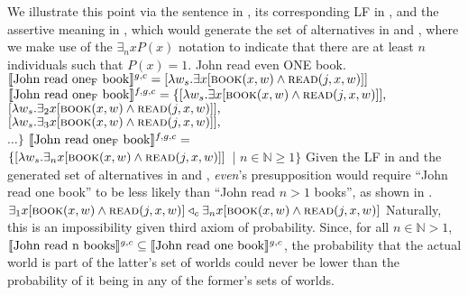 We illustrate this point via the sentence in , its corresponding LF in , and the assertive meaning in , which would generate the set of alternatives in  and , where we make use of the $\exists_nxP(x)$ notation to indicate that there are at least $n$ individuals such that $P(x)=1$.
\pex
\a\ljudge{\#} John read even \MakeUppercase{one} book.
\a[] [even\textsubscript{C} [John read one\textsubscript{F} book]
\a $\intension[g,c]{John read one\textsubscript{F} book}=[\lambda{w_s}.\exists{x}[\predicate{book}(x,w)\land\predicate{read}(j,x,w)]]$
\a $\intension[f,g,c]{John read one\textsubscript{F} book}=\{[\lambda{w_s}.\exists{x}[\predicate{book}(x,w)\land\predicate{read}(j,x,w)]],$\\
$[\lambda{w_s}.\exists_2{x}[\predicate{book}(x,w)\land\predicate{read}(j,x,w)]],$\\
$[\lambda{w_s}.\exists_3{x}[\predicate{book}(x,w)\land\predicate{read}(j,x,w)]],$\\
$\ldots\}$
\a $\intension[f,g,c]{John read one\textsubscript{F} book}=$\\\emptyfill$\{[\lambda{w_s}.\exists_n{x}[\predicate{book}(x,w)\land\predicate{read}(j,x,w)]]$~| $n\in\mathbb{N}\geqslant1\}$
\xe
Given the LF in  and the generated set of alternatives in  and , \textit{even}'s presupposition would require \enquote{John read one book} to be less likely than \enquote{John read $n>1$ books}, as shown in .
\ex
{}\\$\exists_1{x}[\predicate{book}(x,w)\land\predicate{read}(j,x,w)]\lprob_c\exists_n{x}[\predicate{book}(x,w)\land\predicate{read}(j,x,w)]$
\xe
Naturally, this is an impossibility given  third axiom of probability. Since, for all $n\in\mathbb{N}>1$, $\intension[g,c]{John read n books}\subseteq\intension[g,c]{John read one book}$, the probability that the actual world is part of the latter's set of worlds could never be lower than the probability of it being in any of the former's sets of worlds.

